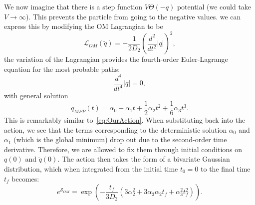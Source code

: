 \documentclass[aps,pra,amsmath,amssymb,amsthm,floatfix,nofootinbib,notitlepage,superscriptaddress,10pt]{revtex4-2}
\begin{document}
We now imagine that there is a step function $V\Theta(-q)$ potential (we could take $V\rightarrow\infty$). This prevents the particle from going to the negative values. we can express this by modifying the OM Lagrangian to be
\begin{equation}
	\mathcal{L}_{OM}(\ddot{q})= -\frac{1}{2D_2}\left(\frac{d^2}{dt^2}|q|\right)^2,
\end{equation}
the variation of the Lagrangian provides the fourth-order Euler-Lagrange equation for the most probable paths:
\begin{equation}
	\frac{d^4}{dt^4}|q|=0,
\end{equation}
with general solution 
\begin{equation}
	q_{MPP}(t)=\alpha_0 + \alpha_1 t+\frac{1}{2}\alpha_2 t^2 + \frac{1}{6}\alpha_3 t^3.
	\label{eq:Qmpp}
\end{equation}
This is remarkably similar to~\eqref{eq:OurAction}.
When substituting back into the action, we see that the terms corresponding to the deterministic solution $\alpha_0$ and $\alpha_1$ (which is the global minimum) drop out due to the second-order time derivative. Therefore, we are allowed to fix them through initial conditions on $q(0)$ and $\dot{q}(0)$. The action then takes the form of a bivariate Gaussian distribution, which when integrated from the initial time $t_0=0$ to the final time $t_f$ becomes:
\begin{equation}
	e^{\mathcal{S}_{OM}}=\exp\left(-\frac{t_f}{3 D_2} \left(3 \alpha _2^2+3 \alpha _3 \alpha _2 t_f+\alpha _3^2 t_f^2\right)\right).\label{eq:Qmppaction}
\end{equation}
\end{document}
